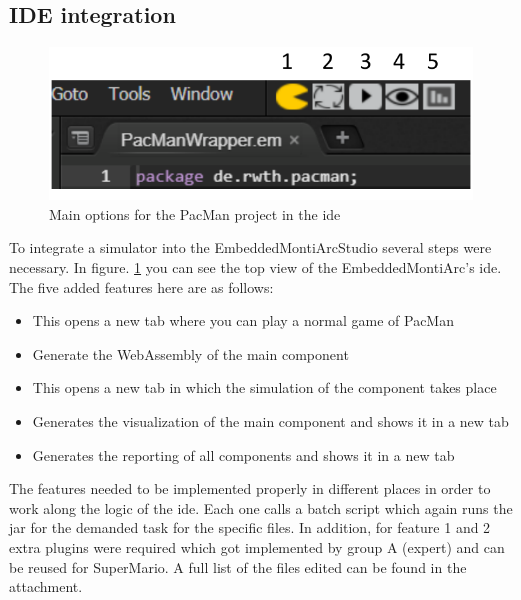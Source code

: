 \subsection{IDE integration}
\begin{figure}
	\label{fig:idePacmanTop}
	\centering
	\includegraphics[scale=0.55]{pictures/IDE-PacMan-Top.pdf}
	\caption{Main options for the PacMan project in the ide}
\end{figure}
To integrate a simulator into the EmbeddedMontiArcStudio several steps were necessary. In figure. \ref{fig:idePacmanTop} you can see the top view of the EmbeddedMontiArc's ide. The five added features here are as follows:
\begin{itemize}
	\item[1.] This opens a new tab where you can play a normal game of PacMan
	\item[2.] Generate the WebAssembly of the main component
	\item[3.] This opens a new tab in which the simulation of the component takes place
	\item[4.] Generates the visualization of the main component and shows it in a new tab
	\item[5.] Generates the reporting of all components and shows it in a new tab
\end{itemize}
The features needed to be implemented properly in different places in order to work along the logic of the ide. Each one calls a batch script which again runs the jar for the demanded task for the specific files. In addition, for feature 1 and 2 extra plugins were required which got implemented by group A (expert) and can be reused for SuperMario.
A full list of the files edited can be found in the attachment.